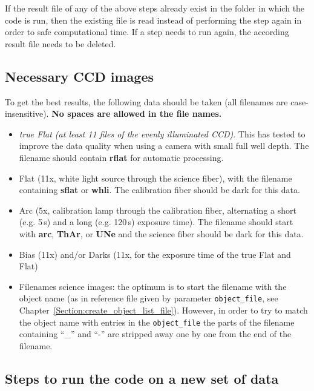 \documentclass[10pt,a4paper]{article}
\begin{document}
\noindent If the result file of any of the above steps already exist in the folder in which the code is run, then the existing file is read instead of performing the step again in order to safe computational time. If a step needs to run again, the according result file needs to be deleted.

\subsection{Necessary CCD images}
To get the best results, the following data should be taken (all filenames are case-insensitive). \textbf{No spaces are allowed in the file names.}
\begin{itemize}
  \item \textit{true Flat (at least 11 files of the evenly illuminated CCD)}. This has tested to improve the data quality when using a camera with small full well depth. The filename should contain \textbf{rflat} for automatic processing.
  \item Flat (11x, white light source through the science fiber), with the filename containing \textbf{sflat} or \textbf{whli}. The calibration fiber should be dark for this data.
  \item Arc (5x, calibration lamp through the calibration fiber, alternating a short (e.g. 5\,s) and a long (e.g. 120\,s) exposure time). The filename should start with \textbf{arc}, \textbf{ThAr}, or \textbf{UNe} and the science fiber should be dark for this data.
  \item Bias (11x) and/or Darks (11x, for the exposure time of the true Flat and Flat)%
  \item Filenames science images: the optimum is to start the filename with the object name (as in reference file given by parameter \verb|object_file|, see Chapter~\ref{Section:create_object_list_file}). However, in order to try to match the object name with entries in the \verb|object_file| the parts of the filename containing ``\_'' and ``-'' are stripped away one by one from the end of the filename.
\end{itemize}

\subsection{Steps to run the code on a new set of data}
\label{section:steps_new_data_set}
\noindent
\end{document}
